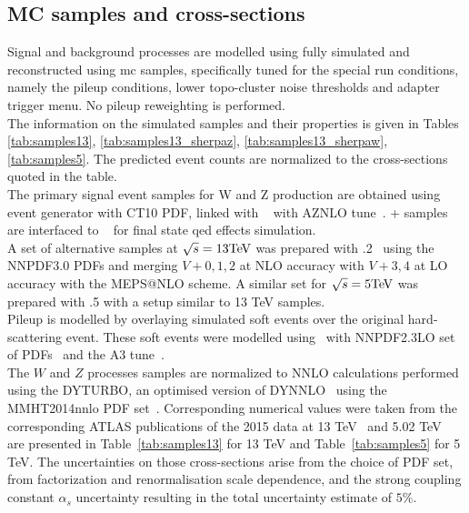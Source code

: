     \subsection{MC samples and cross-sections}
    Signal and background processes are modelled using fully simulated and reconstructed using \gls{mc} samples, specifically tuned for the special run conditions, namely the pileup conditions, lower topo-cluster noise thresholds and adapter trigger menu. No pileup reweighting is performed.\\
    The information on the simulated samples and their properties is given in Tables \ref{tab:samples13}, \ref{tab:samples13_sherpaz}, \ref{tab:samples13_sherpaw},  \ref{tab:samples5}. The predicted event counts are normalized to the cross-sections quoted in the table.\\
    The primary signal event samples for W and Z production are obtained using \Powheg~\cite{Nason:2004rx,Frixione:2007vw,Alioli:2008gx,Alioli:2010xd} event generator with CT10 PDF, linked with \Pythia~\cite{pythia} with AZNLO tune~\cite{STDM-2012-23}. \Powheg+ samples are interfaced to \Photos~\cite{Golonka:2005pn}  for final state \gls{qed} effects simulation.\\
    A set of alternative samples at $\sqrt{s} = 13\text{Te\kern -0.1em V}$ was prepared with .2~\cite{Hoche:2010kg} using the NNPDF3.0 PDFs and merging
    $V+0,1,2$ at NLO accuracy with $V+3,4$ at LO accuracy with the MEPS@NLO scheme. A similar set for $\sqrt{s} = 5\text{Te\kern -0.1em V}$ was prepared with .5 with a setup similar to 13 TeV samples.\\
    Pileup is modelled by overlaying simulated soft events over the original hard-scattering event. These soft events were modelled using \Pythia\ with NNPDF2.3LO set of PDFs~\cite{Ball:2012cx} and the A3 tune~\cite{ATL-PHYS-PUB-2016-017}.\\
    The $W$ and $Z$ processes samples are normalized to NNLO
    calculations performed using the DYTURBO, an optimised version
    of DYNNLO~\cite{Catani:2007vq,Catani:2009sm} using the MMHT2014nnlo PDF
    set~\cite{Harland-Lang:2014zoa}. Corresponding numerical values were taken from
    the corresponding ATLAS publications of the 2015 data at 13
    TeV~\cite{STDM-2015-03} and 5.02 TeV~\cite{HION-2018-02} are presented in Table~\ref{tab:samples13} for 13 TeV and Table~\ref{tab:samples5} for 5 TeV. The
    uncertainties on those cross-sections arise from the choice of PDF set, from factorization
    and renormalisation scale dependence, and the strong
    coupling constant $\alpha_s$ uncertainty resulting in the total 
    uncertainty estimate of $5\%$.
    
